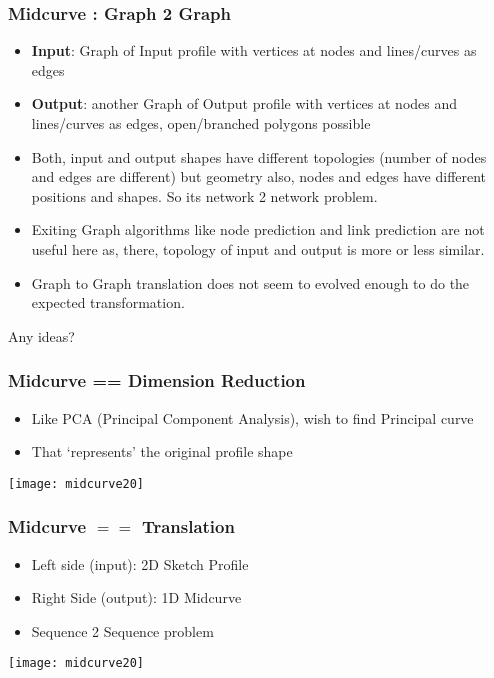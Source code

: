 \begin{frame}[fragile]\frametitle{Midcurve : Graph 2 Graph}

	\begin{itemize}
	\item {\bf Input}: Graph of Input profile with vertices at nodes and lines/curves as edges
	\item {\bf Output}: another Graph of Output profile with vertices at nodes and lines/curves as edges, open/branched polygons possible
	\item Both, input and output shapes have different topologies (number of nodes and edges are different) but geometry also, nodes and edges have different positions and shapes. So its network 2 network problem.
	\item Exiting Graph algorithms like node prediction and link prediction are not useful here as, there, topology of input and output is more or less similar.
	\item Graph to Graph translation does not seem to evolved enough to do the expected transformation.
	\end{itemize}
	
Any ideas?

\end{frame}

\begin{frame}[fragile]\frametitle{Midcurve == Dimension Reduction}

	\begin{itemize}
	\item Like PCA (Principal Component Analysis), wish to find Principal curve
	\item That `represents' the original profile shape
	\end{itemize}
\begin{center}
\texttt{[image: midcurve20]}
\end{center}	
\end{frame}

\begin{frame}[fragile]\frametitle{Midcurve $==$ Translation}

	\begin{itemize}
	\item Left side (input): 2D Sketch Profile
	\item Right Side (output): 1D Midcurve
	\item Sequence 2 Sequence problem
	\end{itemize}
\begin{center}
\texttt{[image: midcurve20]}
\end{center}	
\end{frame}

